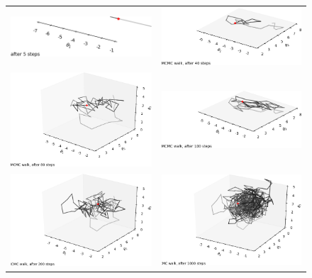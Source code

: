 \documentclass[11pt,singleside,a4paper,makeidx,notitlepage]{article}
\begin{document}
\begin{figure}[h!t]
\begin{center}
\begin{tabular}{cc}
\includegraphics[width=.49\textwidth]{1d_5_trimmed.png} &
\includegraphics[width=.49\textwidth]{2d_40_trimmed.png} \\
\includegraphics[width=.49\textwidth]{3d_80_trimmed.png} &
\includegraphics[width=.49\textwidth]{2d_100_trimmed.png} \\ 
\includegraphics[width=.49\textwidth]{3d_200_trimmed.png} &
\includegraphics[width=.49\textwidth]{3d_1000_trimmed.png} \\

\end{tabular}
\end{center}
\end{figure}
\end{document}
